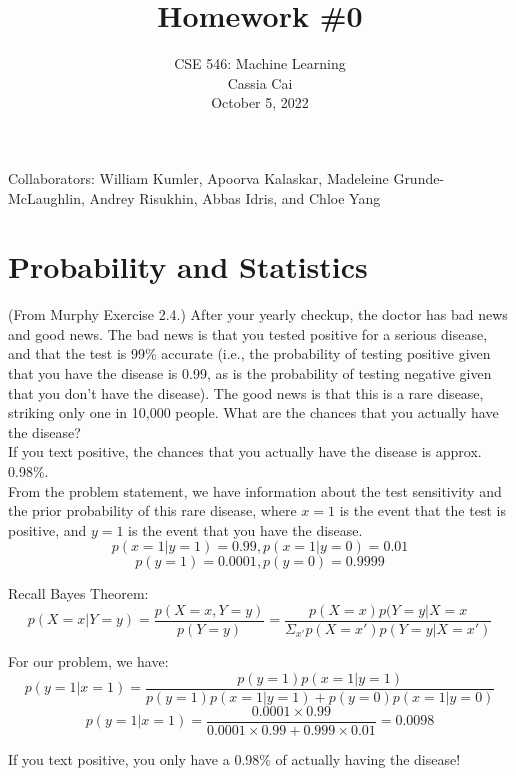 \documentclass{article}
\begin{document}
\title{Homework \#0}
\author{
    \normalsize{CSE 546: Machine Learning}\\
    \normalsize{Cassia Cai}\\
    \normalsize{October 5, 2022}\\
}
\date{{}}
\maketitle

Collaborators: William Kumler, Apoorva Kalaskar, Madeleine Grunde-McLaughlin, Andrey Risukhin, Abbas Idris, and Chloe Yang

\section*{Probability and Statistics}
\begin{aprob}
     (From Murphy Exercise 2.4.) 
    After your yearly checkup, the doctor has bad news and good news. 
    The bad news is that you tested positive for a serious disease, and that the test is 99\% accurate (i.e., the probability of testing positive given that you have the disease is 0.99, as is the probability of testing negative given that you don't have the disease).
    The good news is that this is a rare disease, striking only one in 10,000 people.
    What are the chances that you actually have the disease?\\
    
    If you text positive, the chances that you actually have the disease is approx. 0.98\%.\\
    
    From the problem statement, we have information about the test sensitivity and the prior probability of this rare disease, where $x=1$ is the event that the test is positive, and $y=1$ is the event that you have the disease.
    \begin{equation} p(x=1|y=1) = 0.99, p(x=1|y=0)=0.01 \end{equation}
    \begin{equation} p(y=1) = 0.0001, p(y=0)=0.9999 \end{equation}
    
    Recall Bayes Theorem:
    \begin{equation} 
    p(X=x|Y=y)=\frac{p(X=x,Y=y)}{p(Y=y)} = \frac{p(X=x)p(Y=y|X=x}{\Sigma_{x'}p(X=x')p(Y=y|X=x')}
    \end{equation}
    
    For our problem, we have:
    \begin{equation} 
    p(y=1|x=1)=\frac{p(y=1)p(x=1|y=1)}{p(y=1)p(x=1|y=1)+p(y=0)p(x=1|y=0)}
    \end{equation}
    \begin{equation} 
    p(y=1|x=1) = \frac{0.0001 \times 0.99}{0.0001 \times 0.99 + 0.999 \times 0.01} = 0.0098
    \end{equation}
    
    If you text positive, you only have a 0.98\% of actually having the disease!\\

\end{aprob}
\end{document}
